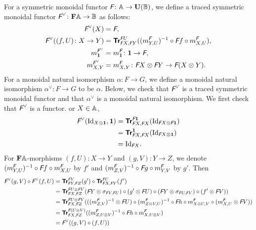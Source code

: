 For a symmetric monoidal functor \(\textit{\textsf{F}} \colon \mathbb{A} \to
\mathbf{U}(\mathbb{B})\), we define a traced symmetric monoidal functor
\(\textit{\textsf{F}}^{\vee} \colon \mathbf{F}\mathbb{A} \to \mathbb{B}\) as follows:
\begin{align*}
  \textit{\textsf{F}}^{\vee}(X) &= \textit{\textsf{F}}, \\
  \textit{\textsf{F}}^{\vee}((f,U) \colon X \to Y)
  &= {\normalfont\textsf{\textbf{Tr}}}^{\textit{\textsf{F}}U}_{\textit{\textsf{F}}X,\textit{\textsf{F}}Y}((m_{Y,U}^{\textit{\textsf{F}}})^{-1} \circ \textit{\textsf{F}}f
  \circ m^{\textit{\textsf{F}}}_{X,U}), \\
  m^{\textit{\textsf{F}}^{\vee}}_{\mathbf 1} &= m^{\textit{\textsf{F}}}_{\mathbf 1} \colon \mathbf 1 \to \textit{\textsf{F}}, \\
  m^{\textit{\textsf{F}}^{\vee}}_{X,Y} &= m^{\textit{\textsf{F}}}_{X,Y} \colon \textit{\textsf{F}}X \otimes \textit{\textsf{F}}Y
  \to \textit{\textsf{F}}(X \otimes Y).
\end{align*}
For a monoidal natural isomorphism \(\alpha \colon F \to G\), we
define a monoidal natural isomorphism \(\alpha^{\vee} \colon F \to G\)
to be \(\alpha\). Below, we check that \(\textit{\textsf{F}}^{\vee}\) is a
traced symmetric monoidal functor and that \(\alpha^{\vee}\) is a
monoidal natural isomorphism. We first check that \(\textit{\textsf{F}}^{\vee}\)
is a functor. or \(X \in \mathbb{A}\),
\begin{align*}
  \textit{\textsf{F}}^{\vee}(\mbox{Id}_{X \otimes \mathbf 1},\mathbf 1)
  &= {\normalfont\textsf{\textbf{Tr}}}^{\textit{\textsf{F}}\mathbf 1}_{\textit{\textsf{F}}X,\textit{\textsf{F}}X}(\mbox{Id}_{\textit{\textsf{F}}X \otimes \textit{\textsf{F}}\mathbf 1}) \\
  &= {\normalfont\textsf{\textbf{Tr}}}^{\mathbf 1}_{\textit{\textsf{F}}X,\textit{\textsf{F}}X}(\mbox{Id}_{\textit{\textsf{F}}X \otimes \mathbf 1}) \\
  &= \mbox{Id}_{\textit{\textsf{F}}X}.
\end{align*}
For \(\mathbf{F}\mathbb{A}\)-morphisms \((f,U) \colon X \to Y\) and \((g,V)
\colon Y \to Z\), we denote \((m_{Y,U}^{\textit{\textsf{F}}})^{-1} \circ
\textit{\textsf{F}}f \circ m^{\textit{\textsf{F}}}_{X,U}\) by \(f'\) and
\((m_{Z,V}^{\textit{\textsf{F}}})^{-1} \circ \textit{\textsf{F}}g \circ
m^{\textit{\textsf{F}}}_{Y,V}\) by \(g'\). Then
\begin{align*}
  \textit{\textsf{F}}^{\vee}(g,V) \circ \textit{\textsf{F}}^{\vee}(f,U)
  &= {\normalfont\textsf{\textbf{Tr}}}^{\textit{\textsf{F}}V}_{\textit{\textsf{F}}Y,\textit{\textsf{F}}Z}(g') \circ
  {\normalfont\textsf{\textbf{Tr}}}^{\textit{\textsf{F}}U}_{\textit{\textsf{F}}X,\textit{\textsf{F}}Y}(f') \\
  &= {\normalfont\textsf{\textbf{Tr}}}^{\textit{\textsf{F}}U \otimes \textit{\textsf{F}}V}_{\textit{\textsf{F}}X,\textit{\textsf{F}}Z}
  (\textit{\textsf{F}}Y \otimes \sigma_{\textit{\textsf{F}}V,\textit{\textsf{F}}U}) \circ
  (g' \otimes \textit{\textsf{F}}U) \circ (\textit{\textsf{F}}Y \otimes \sigma_{\textit{\textsf{F}}U,\textit{\textsf{F}}V}) \circ
  (f' \otimes \textit{\textsf{F}}V)) \\
  &= {\normalfont\textsf{\textbf{Tr}}}^{\textit{\textsf{F}}U \otimes \textit{\textsf{F}}V}_{\textit{\textsf{F}}X,\textit{\textsf{F}}Z}(((m_{Z,V}^{\textit{\textsf{F}}})^{-1}
  \otimes \textit{\textsf{F}}U) \circ
  (m_{Z \otimes V,U}^{\textit{\textsf{F}}})^{-1} \circ
  \textit{\textsf{F}}h \circ m_{X \otimes U,V}^{\textit{\textsf{F}}} \circ (m_{X,U}^{\textit{\textsf{F}}} \otimes \textit{\textsf{F}}V)) \\
  &= {\normalfont\textsf{\textbf{Tr}}}^{\textit{\textsf{F}}(U \otimes V)}_{\textit{\textsf{F}}X,\textit{\textsf{F}}Z}((m_{Z,U \otimes V}^{\textit{\textsf{F}}})^{-1} \circ
  \textit{\textsf{F}}h \circ m_{X, U \otimes V}^{\textit{\textsf{F}}}) \\
  &= \textit{\textsf{F}}^{\vee}((g,V) \circ (f,U))
\end{align*}
